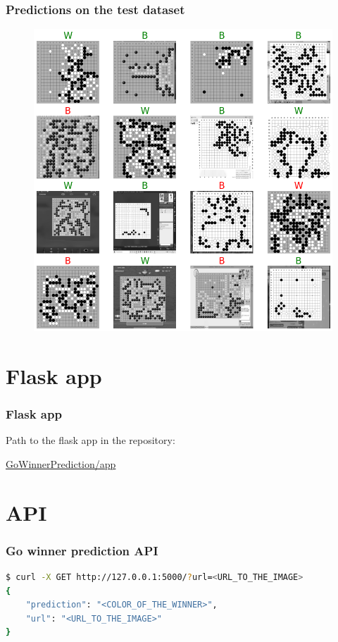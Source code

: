 \documentclass{beamer}
\begin{document}

\begin{frame}
\frametitle{Predictions on the test dataset}

\begin{figure}
	\centering
	\includegraphics[scale=0.25]{images/predictions.png}
\end{figure}


\end{frame}


\section{Flask app}
\begin{frame}
\frametitle{Flask app}

\begin{center}
Path to the flask app in the repository: 

\url{GoWinnerPrediction/app}
\end{center}

\end{frame}

\section{API}
\begin{frame}[fragile]
\frametitle{Go winner prediction API}
\begin{lstlisting}[basicstyle=\footnotesize, language=bash]
$ curl -X GET http://127.0.0.1:5000/?url=<URL_TO_THE_IMAGE>
{
    "prediction": "<COLOR_OF_THE_WINNER>",
    "url": "<URL_TO_THE_IMAGE>"
}
\end{lstlisting}

\end{frame}
\end{document}
